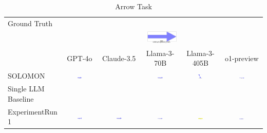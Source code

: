 \begin{table}
  \caption{Arrow Task}
  \label{table:arrow}
  \centering
  \begin{tabular}{@{}lccccc@{}}
    \toprule
    Ground Truth \\
    & \multicolumn{5}{c}{\includegraphics[width=0.15\textwidth]{examples_png/Arrow.png}} \\
    & GPT-4o & Claude-3.5 & Llama-3-70B & Llama-3-405B & o1-preview \\
    \midrule
    SOLOMON & \includegraphics[width=0.15\textwidth]{./pool_all/png/gpt-4o_results/Arrow.png} &  & \includegraphics[width=0.15\textwidth]{./pool_all/png/claude-3-5-sonnet-20240620_results/Arrow.png} & \includegraphics[width=0.15\textwidth]{./pool_all/png/watsonx_meta-llama_llama-3-1-70b-instruct_results/Arrow.png} & \includegraphics[width=0.15\textwidth]{./pool_all/png/watsonx_meta-llama_llama-3-405b-instruct_results/Arrow.png} \\
    Single LLM Baseline \\
    ExperimentRun 1 & \includegraphics[width=0.15\textwidth]{./run_1/png/gpt-4o_results/Arrow.png} & \includegraphics[width=0.15\textwidth]{./run_1/png/o1-preview_results/Arrow.png} & \includegraphics[width=0.15\textwidth]{./run_1/png/claude-3-5-sonnet-20240620_results/Arrow.png} & \includegraphics[width=0.15\textwidth]{./run_1/png/watsonx_meta-llama_llama-3-1-70b-instruct_results/Arrow.png} & \includegraphics[width=0.15\textwidth]{./run_1/png/watsonx_meta-llama_llama-3-405b-instruct_results/Arrow.png} \\

\end{tabular}
\end{table}
